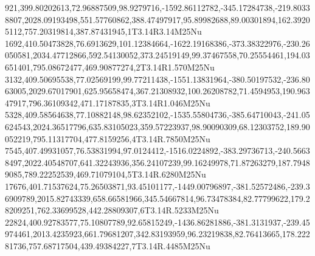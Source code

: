 921,399.80202613,72.96887509,98.9279716,-1592.86112782,-345.17284738,-219.80338807,2028.09193498,551.57760862,388.47497917,95.89982688,89.00301894,162.39205112,757.20319814,387.87431945,1T3.14R3.14M25Nu
1692,410.50473828,76.6913629,101.12384664,-1622.19168386,-373.38322976,-230.26050581,2034.47712866,592.54130052,373.24519149,99.37467558,70.25554461,194.03651401,795.08672477,469.90877274,2T3.14R1.570M25Nu
3132,409.50695538,77.02569199,99.77211438,-1551.13831964,-380.50197532,-236.8063005,2029.67017901,625.95658474,367.21308932,100.26208782,71.4594953,190.96347917,796.36109342,471.17187835,3T3.14R1.046M25Nu
5328,409.58564638,77.10882148,98.62352102,-1535.55804736,-385.64710043,-241.05624543,2024.36517796,635.83105023,359.57223937,98.90090309,68.12303752,189.90052219,795.11317704,477.8159256,4T3.14R.7850M25Nu
7545,407.49931057,76.53831994,97.0124412,-1516.0224892,-383.29736713,-240.56638497,2022.40548707,641.32243936,356.24107239,99.16249978,71.87263279,187.79489085,789.22252539,469.71079104,5T3.14R.6280M25Nu
17676,401.71537624,75.26503871,93.45101177,-1449.00796897,-381.52572486,-239.36909789,2015.82743339,658.66581966,345.54667814,96.73478384,82.77799622,179.28209251,762.33699528,442.28809307,6T3.14R.5233M25Nu
22824,400.92783577,75.10807789,92.65815249,-1436.86281886,-381.3131937,-239.45974461,2013.4235923,661.79681207,342.83193959,96.23219838,82.76413665,178.22281736,757.68717504,439.49384227,7T3.14R.4485M25Nu
